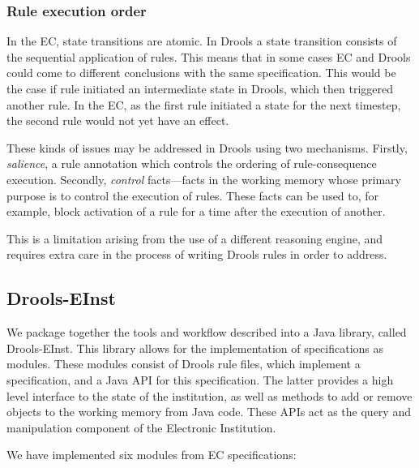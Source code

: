 \subsubsection*{Rule execution order}

In the EC, state transitions are atomic. In Drools a state transition consists of the sequential application of rules. This means that in some cases EC and Drools could come to different conclusions with the same specification. This would be the case if rule initiated an intermediate state in Drools, which then triggered another rule. In the EC, as the first rule initiated a state for the next timestep, the second rule would not yet have an effect.

These kinds of issues may be addressed in Drools using two mechanisms. Firstly, \emph{salience}, a rule annotation which controls the ordering of rule-consequence execution. Secondly, \emph{control} facts---facts in the working memory whose primary purpose is to control the execution of rules. These facts can be used to, for example, block activation of a rule for a time after the execution of another.

This is a limitation arising from the use of a different reasoning engine, and requires extra care in the process of writing Drools rules in order to address.

\subsection{Drools-EInst}

We package together the tools and workflow described into a Java library,
called Drools-EInst. This library allows for the implementation of
specifications as modules. These modules consist of Drools rule files, which
implement a specification, and a Java \ac{API} for this specification. The
latter provides a high level interface to the state of the institution, as
well as methods to add or remove objects to the working memory from Java code.
These \ac{API}s act as the query and manipulation component of the Electronic
Institution.

We have implemented six modules from \ac{EC} specifications:

